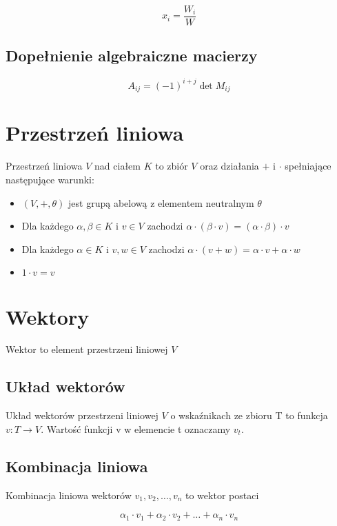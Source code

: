 \documentclass{../notatki}
\begin{document}
$$
x_i = \frac{W_i}{W}
$$

\subsection{Dopełnienie algebraiczne macierzy}

$$
A_{ij} = (-1)^{i + j} \det M_{ij} 
$$

\section{Przestrzeń liniowa}

Przestrzeń liniowa $V$ nad ciałem $K$ to zbiór $V$ oraz działania $+$ i $\cdot$ spełniające następujące warunki:

\begin{itemize}
    \item $(V, +, \theta)$ jest grupą abelową z elementem neutralnym $\theta$
    \item Dla każdego $\alpha, \beta \in K$ i $v \in V$ zachodzi $\alpha \cdot (\beta \cdot v) = (\alpha \cdot \beta) \cdot v$
    \item Dla każdego $\alpha \in K$ i $v, w \in V$ zachodzi $\alpha \cdot (v + w) = \alpha \cdot v + \alpha \cdot w$
    \item $1 \cdot v = v$
\end{itemize}

\section{Wektory}

Wektor to element przestrzeni liniowej $V$

\subsection{Układ wektorów}

Układ wektorów przestrzeni liniowej $V$ o wskaźnikach ze zbioru T to funkcja $v: T \rightarrow V$. Wartość funkcji v w elemencie t oznaczamy $v_t$.

\subsection{Kombinacja liniowa}

Kombinacja liniowa wektorów $v_1, v_2, \dots, v_n$ to wektor postaci

$$
\alpha_1 \cdot v_1 + \alpha_2 \cdot v_2 + \dots + \alpha_n \cdot v_n
$$
\end{document}
